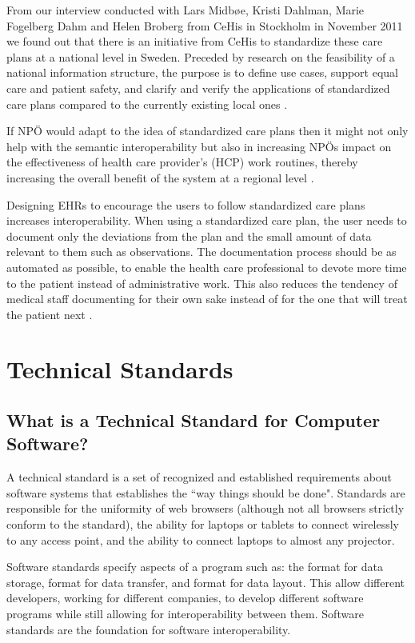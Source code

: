 \documentclass[14pt]{article}
\begin{document}
From our interview conducted with Lars Midbøe, Kristi Dahlman, Marie Fogelberg Dahm and Helen Broberg from \gls{CeHis} in Stockholm in November 2011 we found out that there is an initiative from CeHis to standardize these care plans at a national level in Sweden. Preceded by research on the feasibility of a national information structure, the purpose is to define use cases, support equal care and patient safety, and clarify and verify the applications of standardized care plans compared to the currently existing local ones \cite{CeHis}.

If NPÖ would adapt to the idea of standardized care plans then it might not only help with the semantic interoperability but also in increasing NPÖs impact on the effectiveness of health care provider's (HCP) work routines, thereby increasing the overall benefit of the system at a regional level \cite{Cambio}.

Designing EHRs to encourage the users to follow standardized care plans increases interoperability. When using a standardized care plan, the user needs to document only the deviations from the plan and the small amount of data relevant to them such as observations. The documentation process should be as automated as possible, to enable the health care professional to devote more time to the patient instead of administrative work. This also reduces the tendency of medical staff documenting for their own sake instead of for the one that will treat the patient next \cite{Cambio}.

\newpage

\section{Technical Standards}
\label{sec:TechnicalStandards}

\subsection{What is a Technical Standard for Computer Software?}
\label{sec:technicalStandardsWhatIs}
A technical standard is a set of recognized and established requirements about software systems that establishes the ``way things should be done". Standards are responsible for the uniformity of web browsers (although not all browsers strictly conform to the standard), the ability for laptops or tablets to connect wirelessly to any access point, and the ability to connect laptops to almost any projector.

Software standards specify aspects of a program such as: the format for data storage, format for data transfer, and format for data layout. This allow different developers, working for different companies, to develop different software programs while still allowing for \gls{interoperability} between them. Software standards are the foundation for software \gls{interoperability}.
\end{document}
